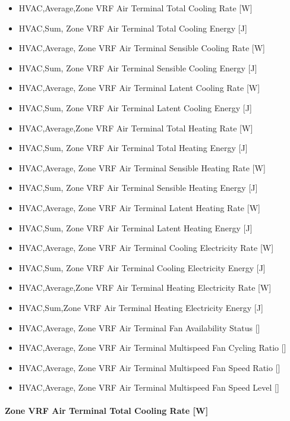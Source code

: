 \begin{itemize}
\item
  HVAC,Average,Zone VRF Air Terminal Total Cooling Rate {[}W{]}
\item
  HVAC,Sum, Zone VRF Air Terminal Total Cooling Energy {[}J{]}
\item
  HVAC,Average, Zone VRF Air Terminal Sensible Cooling Rate {[}W{]}
\item
  HVAC,Sum, Zone VRF Air Terminal Sensible Cooling Energy {[}J{]}
\item
  HVAC,Average, Zone VRF Air Terminal Latent Cooling Rate {[}W{]}
\item
  HVAC,Sum, Zone VRF Air Terminal Latent Cooling Energy {[}J{]}
\item
  HVAC,Average,Zone VRF Air Terminal Total Heating Rate {[}W{]}
\item
  HVAC,Sum, Zone VRF Air Terminal Total Heating Energy {[}J{]}
\item
  HVAC,Average, Zone VRF Air Terminal Sensible Heating Rate {[}W{]}
\item
  HVAC,Sum, Zone VRF Air Terminal Sensible Heating Energy {[}J{]}
\item
  HVAC,Average, Zone VRF Air Terminal Latent Heating Rate {[}W{]}
\item
  HVAC,Sum, Zone VRF Air Terminal Latent Heating Energy {[}J{]}
\item
  HVAC,Average, Zone VRF Air Terminal Cooling Electricity Rate {[}W{]}
\item
  HVAC,Sum, Zone VRF Air Terminal Cooling Electricity Energy {[}J{]}
\item
  HVAC,Average,Zone VRF Air Terminal Heating Electricity Rate {[}W{]}
\item
  HVAC,Sum,Zone VRF Air Terminal Heating Electricity Energy {[}J{]}
\item
  HVAC,Average, Zone VRF Air Terminal Fan Availability Status {[]}
\item
  HVAC,Average, Zone VRF Air Terminal Multispeed Fan Cycling Ratio {[]}
\item
  HVAC,Average, Zone VRF Air Terminal Multispeed Fan Speed Ratio {[]}
\item
  HVAC,Average, Zone VRF Air Terminal Multispeed Fan Speed Level {[]}
\end{itemize}

\paragraph{Zone VRF Air Terminal Total Cooling Rate {[}W{]}}\label{zone-vrf-air-terminal-total-cooling-rate-w}

